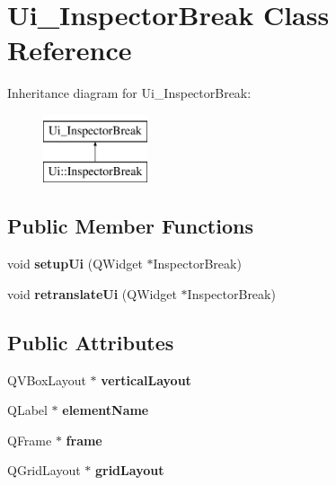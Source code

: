 \hypertarget{class_ui___inspector_break}{}\section{Ui\+\_\+\+Inspector\+Break Class Reference}
\label{class_ui___inspector_break}
Inheritance diagram for Ui\+\_\+\+Inspector\+Break\+:\begin{figure}[H]
\begin{center}
\leavevmode
\includegraphics[height=2.000000cm]{class_ui___inspector_break}
\end{center}
\end{figure}
\subsection*{Public Member Functions}
\begin{DoxyCompactItemize}
\item 
\mbox{\label{class_ui___inspector_break_ab698db4ab3eb767c6dd14b599132643f}} 
void {\bfseries setup\+Ui} (Q\+Widget $\ast$Inspector\+Break)
\item 
\mbox{\label{class_ui___inspector_break_a0260073793b8f2d9e4ddce1c37f23a24}} 
void {\bfseries retranslate\+Ui} (Q\+Widget $\ast$Inspector\+Break)
\end{DoxyCompactItemize}
\subsection*{Public Attributes}
\begin{DoxyCompactItemize}
\item 
\mbox{\label{class_ui___inspector_break_aba68aeffd17ac938faeb5a0d6d88c641}} 
Q\+V\+Box\+Layout $\ast$ {\bfseries vertical\+Layout}
\item 
\mbox{\label{class_ui___inspector_break_a222f78825288e906517eb99fd0bc7b77}} 
Q\+Label $\ast$ {\bfseries element\+Name}
\item 
\mbox{\label{class_ui___inspector_break_abd711064e2eae68a569af6f51a6da79a}} 
Q\+Frame $\ast$ {\bfseries frame}
\item 
\mbox{\label{class_ui___inspector_break_a77b17bdf7a94ca25e6348b4db5016ae0}} 
Q\+Grid\+Layout $\ast$ {\bfseries grid\+Layout}
\end{DoxyCompactItemize}


